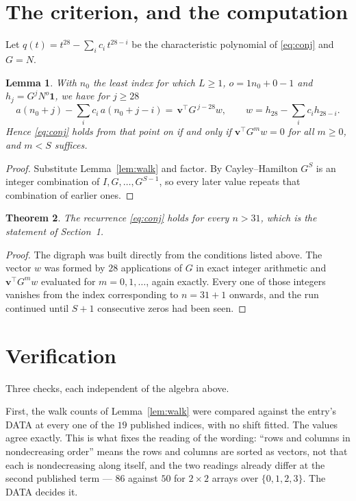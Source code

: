 \documentclass[11pt,a4paper]{article}
\theoremstyle{plain}
\newtheorem{theorem}{Theorem}
\newtheorem{lemma}[theorem]{Lemma}
\theoremstyle{definition}
\begin{document}
\section{The criterion, and the computation}

Let $q(t)=t^{28}-\sum_i c_i\,t^{28-i}$ be the characteristic polynomial of
\eqref{eq:conj} and $G=N$.

\begin{lemma}\label{lem:crit}
With $n_0$ the least index for which $L\ge1$, $o=1n_0+0-1$ and
$h_j=G^{j}N^{o}\mathbf{1}$, we have for $j\ge28$
\[
a(n_0+j)-\sum_i c_i\,a(n_0+j-i)=\,\mathbf{v}^{\!\top}G^{\,j-28}w,
\qquad w=h_{28}-\sum_i c_ih_{28-i} .
\]
Hence \eqref{eq:conj} holds from that point on if and only if
$\mathbf{v}^{\!\top}G^{m}w=0$ for all $m\ge0$, and $m<S$ suffices.
\end{lemma}

\begin{proof}
Substitute Lemma~\ref{lem:walk} and factor. By Cayley--Hamilton $G^{S}$ is an integer
combination of $I,G,\dots,G^{S-1}$, so every later value repeats that combination of
earlier ones.
\end{proof}

\begin{theorem}
The recurrence \eqref{eq:conj} holds for every $n>31$, which is the statement of
Section~1.
\end{theorem}

\begin{proof}
The digraph was built directly from the conditions listed above. The vector $w$ was formed by
$28$ applications of $G$ in exact integer arithmetic and $\mathbf{v}^{\!\top}G^{m}w$
evaluated for $m=0,1,\dots$, again exactly. Every one of those integers vanishes from the
index corresponding to $n=31+1$ onwards, and the run continued until $S+1$ consecutive
zeros had been seen.
\end{proof}

\section{Verification}

Three checks, each independent of the algebra above.

First, the walk counts of Lemma~\ref{lem:walk} were compared against the entry's DATA at
every one of the $19$ published indices, with no shift fitted. The values agree exactly.
This is what fixes the reading of the wording: ``rows and columns in nondecreasing order''
means the rows and columns are sorted as vectors, not that each is nondecreasing along
itself, and the two readings already differ at the second published term --- $86$ against
$50$ for $2\times2$ arrays over $\{0,1,2,3\}$. The DATA decides it.
\end{document}
